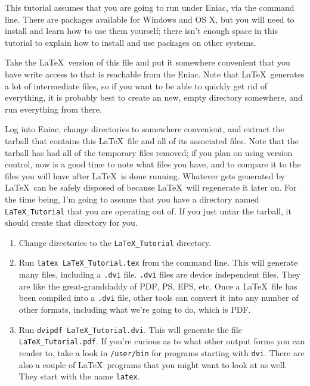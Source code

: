\documentclass[letterpaper]{article}
\begin{document}
This tutorial assumes that you are going to run under Eniac, via the 
command line.  There are packages available for Windows and OS X, but 
you will need to install and learn how to use them yourself; there 
isn't enough space in this tutorial to explain how to install and use packages
on other systems.

Take the \LaTeX\ version of this file and put it somewhere convenient 
that you have write access to that is reachable from the Eniac.  Note 
that \LaTeX\ generates a lot of intermediate files, so if you want to be 
able to quickly get rid of everything, it is probably best to create an 
new, empty directory somewhere, and run everything from there.

Log into Eniac, change directories to somewhere convenient, and extract 
the tarball that contains this \LaTeX\ file and all of its associated 
files.  Note that the tarball has had all of the temporary files 
removed; if you plan on using version control, now is a good time to 
note what files you have, and to compare it to the files you will have 
after \LaTeX\ is done running.  Whatever gets generated by \LaTeX\ can 
be safely disposed of because \LaTeX\ will regenerate it later on.  For 
the time being, I'm going to assume that you have a directory named 
\texttt{LaTeX\_Tutorial} that you are operating out of.  If you just 
untar the tarball, it should create that directory for you.

\begin{enumerate}

\item Change directories to the \texttt{LaTeX\_Tutorial} directory.

\item Run \texttt{latex LaTeX\_Tutorial.tex} from the command line.  
This will generate many files, including a \texttt{.dvi} file.  
\texttt{.dvi} files are device independent files.  They are like the 
great-granddaddy of PDF, PS, EPS, etc.  Once a \LaTeX\ file has been 
compiled into a \texttt{.dvi} file, other tools can convert it into any 
number of other formats, including what we're going to do, which is PDF.

\item Run \texttt{dvipdf LaTeX\_Tutorial.dvi}.  This will generate the 
file \texttt{LaTeX\_Tutorial.pdf}.  If you're curious as to what 
other output forms you can render to, take a look in \texttt{/user/bin} 
for programs starting with \texttt{dvi}.  There are also a couple of 
\LaTeX\ programs that you might want to look at as well. They start with 
the name \texttt{latex}.

\end{enumerate}
\end{document}

